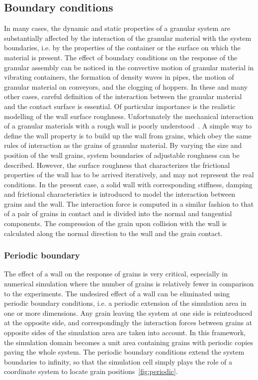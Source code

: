 \subsection{Boundary conditions}
In many cases, the dynamic and static properties of a granular system are 
substantially affected 
by 
the interaction of the granular material with the system boundaries, i.e. by 
the properties of the 
container or the surface on which the material is present. The effect of 
boundary conditions on 
the 
response of the granular assembly can be noticed in the convective motion of 
granular material in 
vibrating containers, the formation of density waves in pipes, the motion of 
granular material on 
conveyors, and the clogging of hoppers. In these and many other cases, careful 
definition of the 
interaction between the granular material and the contact surface is essential. 
Of particular 
importance is the realistic modelling of the wall surface roughness. 
Unfortunately the mechanical 
interaction of a granular materials with a rough wall is poorly 
understood~\citep{Posch2005}. A 
simple way to define the wall property is to build up the wall from grains, 
which obey the same 
rules of interaction as the grains of granular material. By varying the size 
and position of 
the 
wall grains, system boundaries of adjustable roughness can be described. 
However, the surface 
roughness that characterizes the frictional properties of the wall has to be 
arrived iteratively, 
and may not represent the real conditions. In the present case, a solid wall 
with corresponding 
stiffness, damping and frictional characteristics is introduced to model the 
interaction between 
grains and the wall. The interaction force is computed in a similar fashion 
to that of a pair 
of 
grains in contact and is divided into the normal and tangential components. 
The compression of 
the grain upon collision with the wall is calculated along the normal 
direction to the wall and 
the grain contact.   

\subsubsection{Periodic boundary} \label{periodic}
The effect of a wall on the response of grains is very critical, especially 
in numerical 
simulation where the number of grains is relatively fewer in comparison to 
the experiments. The 
undesired effect of a wall can be eliminated using periodic boundary 
conditions, i.e. a periodic 
extension of the simulation area in one or more dimensions. Any grain 
leaving the system at one 
side is reintroduced at the opposite side, and correspondingly the interaction 
forces between 
grains at opposite sides of the simulation area are taken into account. In 
this framework, the 
simulation domain becomes a unit area containing grains with periodic copies 
paving the whole 
system. The periodic boundary conditions extend the system boundaries to 
infinity, so that the 
simulation cell simply plays the role of a coordinate system to locate grain 
positions~\ref{fig:periodic}. 

